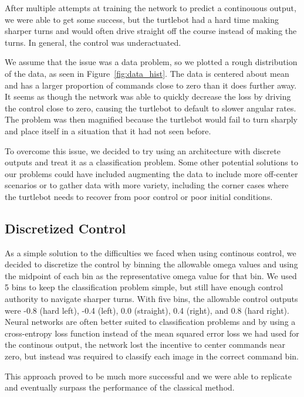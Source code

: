 After multiple attempts at training the network to predict a continouous output, we were able to get some success, but the turtlebot had a hard time making sharper turns and would often drive straight off the course instead of making the turns. In general, the control was underactuated.

We assume that the issue was a data problem, so we plotted a rough distribution of the data, as seen in Figure~\ref{fig:data_hist}. The data is centered about mean and has a larger proportion of commands close to zero than it does further away. It seems as though the network was able to quickly decrease the loss by driving the control close to zero, causing the turtlebot to default to slower angular rates. The problem was then magnified because the turtlebot would fail to turn sharply and place itself in a situation that it had not seen before.

To overcome this issue, we decided to try using an architecture with discrete outputs and treat it as a classification problem. Some other potential solutions to our problems could have included augmenting the data to include more off-center scenarios or to gather data with more variety, including the corner cases where the turtlebot needs to recover from poor control or poor initial conditions.

\subsection{Discretized Control}
As a simple solution to the difficulties we faced when using continous control, we decided to discretize the control by binning the allowable omega values and using the midpoint of each bin as the representative omega value for that bin. We used 5 bins to keep the classification problem simple, but still have enough control authority to navigate sharper turns. With five bins, the allowable control outputs were -0.8 (hard left), -0.4 (left), 0.0 (straight), 0.4 (right), and 0.8 (hard right). Neural networks are often better suited to classification problems and by using a cross-entropy loss function instead of the mean squared error loss we had used for the continous output, the network lost the incentive to center commands near zero, but instead was required to classify each image in the correct command bin.

This approach proved to be much more successful and we were able to replicate and eventually surpass the performance of the classical method.
